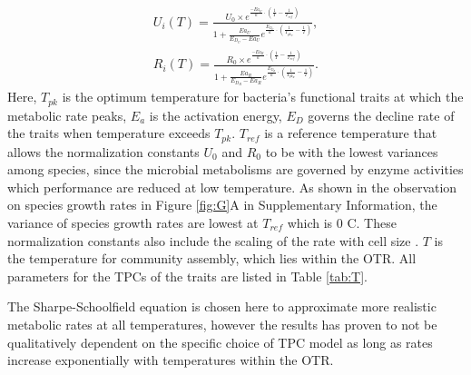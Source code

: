 \documentclass[11pt, a4paper]{article}
\begin{document}
\begin{spacing}{1.5}
\begin{align}\label{eq:U+R}
    U_i(T) = \frac{U_0\times {e^{\frac{-Ea_U}{k}\cdot\left(\frac{1}{T} - \frac{1}{T_{ref}}\right)}}}{1 + \frac{Ea_U}{E_{D_U}-Ea_U}e^{\frac{E_{D_U}}{k}\cdot(\frac{1}{T_{pk_U}}-\frac{1}{T})}}, \\
    R_i(T) = \frac{R_0 \times {e^{\frac{-Ea_R}{k}\cdot\left(\frac{1}{T} - \frac{1}{T_{ref}}\right)}}}{1 + \frac{Ea_R}{E_{D_R}-Ea_R}e^{\frac{E_{D_R}}{k}\cdot(\frac{1}{T_{pk_R}}-\frac{1}{T})}}.
\end{align}
Here, $T_{pk}$ is the optimum temperature for bacteria’s functional traits at which the metabolic rate peaks, $E_a$ is the activation energy, $E_D$ governs the decline rate of the traits when temperature exceeds $T_{pk}$. $T_{ref}$ is a reference temperature that allows the normalization constants $U_0$ and $R_0$ to be with the lowest variances among species, since the microbial metabolisms are governed by enzyme activities which performance are reduced at low temperature. As shown in the observation on species growth rates in Figure \ref{fig:G}A in Supplementary Information, the variance of species growth rates are lowest at $T_{ref}$ which is 0 \textdegree C. These normalization constants also include the scaling of the rate with cell size \citep{brown2004toward}. $T$ is the temperature for community assembly, which lies within the OTR. All parameters for the TPCs of the traits are listed in Table \ref{tab:T}. 

The Sharpe-Schoolfield equation is chosen here to approximate more realistic metabolic rates at all temperatures, however the results has proven to not be qualitatively dependent on the specific choice of TPC model as long as rates increase exponentially with temperatures within the OTR. 


\end{spacing}
\end{document}
